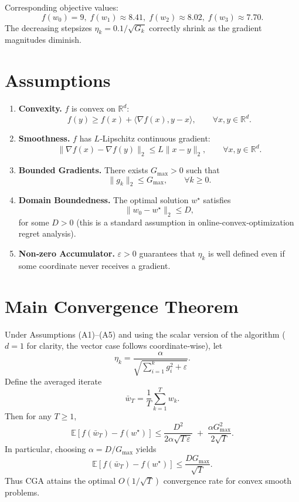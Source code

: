 \documentclass{article}
\begin{document}
Corresponding objective values:
\[
f(w_{0})=9,\;
f(w_{1})\approx8.41,\;
f(w_{2})\approx8.02,\;
f(w_{3})\approx7.70.
\]
The decreasing stepsizes $\eta_{k}=0.1/\sqrt{G_{k}}$ correctly shrink as the
gradient magnitudes diminish.

\section*{Assumptions}
\begin{enumerate}[label=(A\arabic*)]
\item \textbf{Convexity.} $f$ is convex on $\mathbb{R}^{d}$:
\[
f(y)\ge f(x)+\langle \nabla f(x),y-x\rangle,\qquad\forall x,y\in\mathbb{R}^{d}.
\]
\item \textbf{Smoothness.} $f$ has $L$‑Lipschitz continuous gradient:
\[
\|\nabla f(x)-\nabla f(y)\|_{2}\le L\|x-y\|_{2},
\qquad\forall x,y\in\mathbb{R}^{d}.
\]
\item \textbf{Bounded Gradients.} There exists $G_{\max}>0$ such that
\[
\|g_{k}\|_{2}\le G_{\max},\qquad\forall k\ge 0.
\]
\item \textbf{Domain Boundedness.} The optimal solution $w^{\star}$ satisfies
\[
\|w_{0}-w^{\star}\|_{2}\le D,
\]
for some $D>0$ (this is a standard assumption in online‑convex‑optimization
regret analysis).
\item \textbf{Non‑zero Accumulator.} $\varepsilon>0$ guarantees that
$\eta_{k}$ is well defined even if some coordinate never receives a gradient.
\end{enumerate}

\section*{Main Convergence Theorem}
\begin{theorem}\label{thm:main}
Under Assumptions (A1)–(A5) and using the scalar version of the algorithm
($d=1$ for clarity, the vector case follows coordinate‑wise), let
\[
\eta_{k}= \frac{\alpha}{\sqrt{\sum_{i=1}^{k}g_{i}^{2}+\varepsilon}}.
\]
Define the averaged iterate
\[
\bar w_{T}= \frac{1}{T}\sum_{k=1}^{T} w_{k}.
\]
Then for any $T\ge 1$,
\[
\boxed{
\mathbb{E}\!\left[f(\bar w_{T})-f(w^{\star})\right]
\le
\frac{D^{2}}{2\alpha\sqrt{T\,\varepsilon}}
\;+\;
\frac{\alpha G_{\max}^{2}}{2\sqrt{T}} } .
\]
In particular, choosing $\alpha = D/G_{\max}$ yields
\[
\mathbb{E}\!\left[f(\bar w_{T})-f(w^{\star})\right]\le
\frac{DG_{\max}}{\sqrt{T}} .
\]
Thus CGA attains the optimal $O(1/\sqrt{T})$ convergence rate for convex
smooth problems.
\end{theorem}
\end{document}
